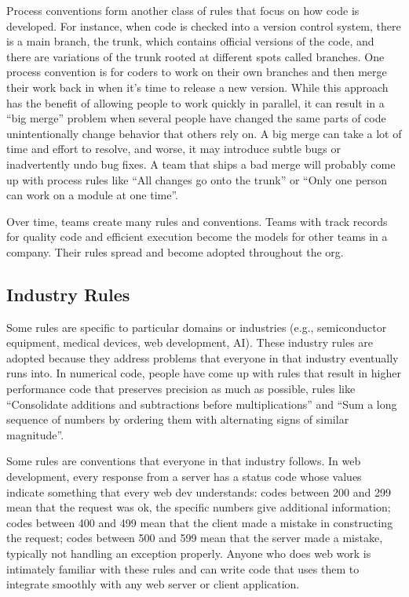 Process conventions form another class of rules that focus on how code is
developed. For instance, when code is checked into a version control system,
there is a main branch, the trunk, which contains official versions of the
code, and there are variations of the trunk rooted at different spots called
branches. One process convention is for coders to work on their own branches
and then merge their work back in when it's time to release a new version.
While this approach has the benefit of allowing people to work quickly in
parallel, it can result in a ``big merge'' problem when several people have
changed the same parts of code unintentionally change behavior that others rely
on. A big merge can take a lot of time and effort to resolve, and worse, it may
introduce subtle bugs or inadvertently undo bug fixes. A team that ships a bad
merge will probably come up with process rules like ``All changes go onto the
trunk'' or ``Only one person can work on a module at one time''.

Over time, teams create many rules and conventions. Teams with track records
for quality code and efficient execution become the models for other teams in a
company. Their rules spread and become adopted throughout the org.

\subsection{Industry Rules}

Some rules are specific to particular domains or industries (e.g.,
semiconductor equipment, medical devices, web development, AI). These industry
rules are adopted because they address problems that everyone in that industry
eventually runs into. In numerical code, people have come up with rules that
result in higher performance code that preserves precision as much as possible,
rules like ``Consolidate additions and subtractions before multiplications'' and
``Sum a long sequence of numbers by ordering them with alternating signs of
similar magnitude''.

Some rules are conventions that everyone in that industry follows. In web
development, every response from a server has a status code whose values
indicate something that every web dev understands: codes between 200 and 299
mean that the request was ok, the specific numbers give additional information;
codes between 400 and 499 mean that the client made a mistake in constructing
the request; codes between 500 and 599 mean that the server made a mistake,
typically not handling an exception properly. Anyone who does web work is
intimately familiar with these rules and can write code that uses them to
integrate smoothly with any web server or client application.

